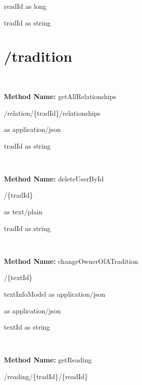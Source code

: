 \begin{parameter}
readId as long
\end{parameter}

\begin{parameter}
tradId as string
\end{parameter}

\section{/tradition}

\

\textbf{Method Name: }getAllRelationships
\begin{get}
/relation/\{tradId\}/relationships
\end{get}

\begin{response}
 as application/json
\end{response}

\begin{parameter}
tradId as string
\end{parameter}

\

\textbf{Method Name: }deleteUserById
\begin{delete}
/\{tradId\}
\end{delete}

\begin{response}
 as text/plain
\end{response}

\begin{parameter}
tradId as string
\end{parameter}

\

\textbf{Method Name: }changeOwnerOfATradition
\begin{post}
/\{textId\}
\end{post}

\begin{request}
textInfoModel as application/json
\end{request}

\begin{response}
 as application/json
\end{response}

\begin{parameter}
textId as string
\end{parameter}

\

\textbf{Method Name: }getReading
\begin{get}
/reading/\{tradId\}/\{readId\}
\end{get}

